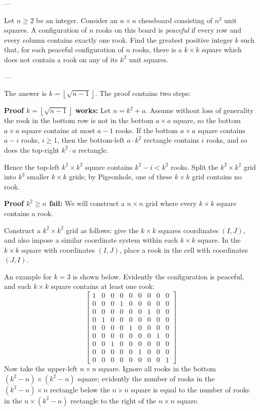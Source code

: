 
---

Let $n\ge2$ be an integer. Consider an $n\times n$ chessboard consisting of $n^2$ unit squares. A configuration of $n$ rooks on this board is \emph{peaceful} if every row and every column contains exactly one rook. Find the greatest positive integer $k$ such that, for each peaceful configuration of $n$ rooks, there is a $k\times k$ square which does not contain a rook on any of its $k^2$ unit squares.

---

The answer is $k=\left\lfloor\sqrt{n-1}\right\rfloor$. The proof contains two steps:

\bigskip

\textbf{Proof $k=\left\lfloor\sqrt{n-1}\right\rfloor$ works:} Let $n=k^2+a$. Assume without loss of generality the rook in the bottom row is not in the bottom $a\times a$ square, so the bottom $a\times a$ square contains at most $a-1$ rooks. If the bottom $a\times a$ square contains $a-i$ rooks, $i\ge1$, then the bottom-left $a\cdot k^2$ rectangle contains $i$ rooks, and so does the top-right $k^2\cdot a$ rectangle.

Hence the top-left $k^2\times k^2$ square contains $k^2-i<k^2$ rooks. Split the $k^2\times k^2$ grid into $k^2$ smaller $k\times k$ grids; by Pigeonhole, one of these $k\times k$ grid contains no rook.

\bigskip

\textbf{Proof $k^2\ge n$ fail:} We will construct a $n\times n$ grid where every $k\times k$ square contains a rook.

Construct a $k^2\times k^2$ grid as follows: give the $k\times k$ squares coordinates $(I,J)$, and also impose a similar coordinate system within each $k\times k$ square. In the $k\times k$ square with coordinates $(I,J)$, place a rook in the cell with coordinates $(J,I)$.

An example for $k=3$ is shown below.
Evidently the configuration is peaceful, and each $k\times k$ square contains at least one rook:
\[
    \left[
        \begin{array}{ccc|ccc|ccc}
            1&0&0&0&0&0&0&0&0\\
            0&0&0&1&0&0&0&0&0\\
            0&0&0&0&0&0&1&0&0\\
            \hline
            0&1&0&0&0&0&0&0&0\\
            0&0&0&0&1&0&0&0&0\\
            0&0&0&0&0&0&0&1&0\\
            \hline
            0&0&1&0&0&0&0&0&0\\
            0&0&0&0&0&1&0&0&0\\
            0&0&0&0&0&0&0&0&1
        \end{array}
    \right]
\]
Now take the upper-left $n\times n$ square. Ignore all rooks in the bottom $(k^2-n)\times(k^2-n)$ square; evidently the number of rooks in the $(k^2-n)\times n$ rectangle below the $n\times n$ square is equal to the number of rooks in the $n\times(k^2-n)$ rectangle to the right of the $n\times n$ square.

